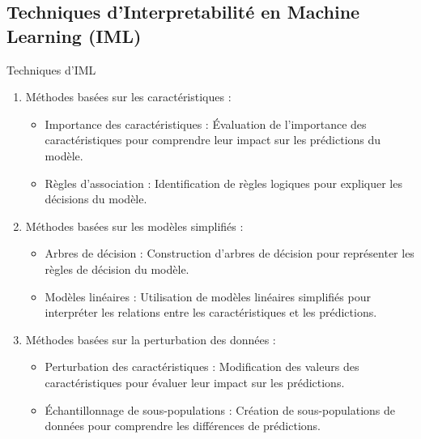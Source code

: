 \documentclass{beamer}
\begin{document}
\subsection{Techniques d'Interpretabilité en Machine Learning (IML)}
\begin{frame}{Techniques d'IML}
	\begin{enumerate}
		\item Méthodes basées sur les caractéristiques :
		\begin{itemize}
			\item Importance des caractéristiques : Évaluation de l'importance des caractéristiques pour comprendre leur impact sur les prédictions du modèle.
			\item Règles d'association : Identification de règles logiques pour expliquer les décisions du modèle.
		\end{itemize}
		\item Méthodes basées sur les modèles simplifiés :
		\begin{itemize}
			\item Arbres de décision : Construction d'arbres de décision pour représenter les règles de décision du modèle.
			\item Modèles linéaires : Utilisation de modèles linéaires simplifiés pour interpréter les relations entre les caractéristiques et les prédictions.
		\end{itemize}
		\item Méthodes basées sur la perturbation des données :
		\begin{itemize}
			\item Perturbation des caractéristiques : Modification des valeurs des caractéristiques pour évaluer leur impact sur les prédictions.
			\item Échantillonnage de sous-populations : Création de sous-populations de données pour comprendre les différences de prédictions.
		\end{itemize}
	\end{enumerate}
\end{frame}
\end{document}
